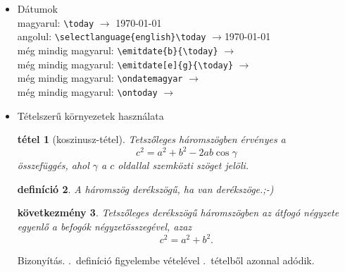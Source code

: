 \documentclass{article}
\newtheorem{tetel}{tétel}
\newtheorem{kovet}[tetel]{következmény}
\newtheorem{defi}[tetel]{definíció}
\begin{document}
\begin{itemize}
\item Dátumok\label{itt}\\
magyarul:
 \verb+\today+ $\longrightarrow$ \today\\
{angolul:
\verb+\selectlanguage{english}\today+ $\longrightarrow$\today} \\
még mindig magyarul:
\verb+\emitdate{b}{\today}+ $\longrightarrow$ \\
még mindig magyarul:
\verb+\emitdate[e]{g}{\today}+ $\longrightarrow$ \\
még mindig magyarul:
\verb+\ondatemagyar+ $\longrightarrow$ \ondatemagyar\\
még mindig magyarul:
 \verb+\ontoday+ $\longrightarrow$ \ontoday\\
 \item Tételszerű környezetek használata
 
 \begin{tetel}[koszinusz-tétel] \label{thm:koszinusz}
 	Tetszőleges háromszögben érvényes a
 	\begin{equation}
 		c^2 = a^2 + b^2 -2ab\cos \gamma
 	\end{equation}
 	összefüggés, ahol $\gamma$ a $c$ oldallal szemközti szöget jelöli.
 \end{tetel}
 
 \begin{defi} \label{def:derekszogu}
 	A háromszög derékszögű, ha van derékszöge.;-)
 \end{defi}
 \begin{kovet}
 	Tetszőleges derékszögű háromszögben az átfogó négyzete egyenlő
 	a befogók négyzetösszegével, azaz
 	\begin{equation}
 		c^2 = a^2 + b^2.
 	\end{equation}
 \end{kovet}
 Bizonyítás. .~definíció figyelembe vételével .~tételből azonnal adódik.

\end{itemize}
\label{ott}
%
\end{document}
